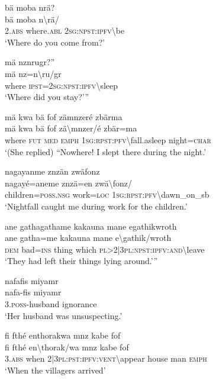 \ea\label{ex:7:a4778}
bä moba nrä?\\
\gll bä	moba	n{\textbackslash}rä/\\
     2.\textsc{abs}	where.\textsc{abl}	2\textsc{sg}:\textsc{npst}:\textsc{ipfv}{\textbackslash}be\\
\glt `Where do you come from?'
\z

\ea\label{ex:7:a4779}
mä nznrugr?''\\
\gll mä	nz=n{\textbackslash}ru/gr\\
     where	\textsc{ipst}=2\textsc{sg}:\textsc{npst}:\textsc{ipfv}{\textbackslash}sleep\\
\glt `Where did you stay?'''
\z

\ea\label{ex:7:a4780}
mä kwa bä fof zämnzeré zbärma\\
\gll mä	kwa	bä	fof	zä{\textbackslash}mnzer/é	zbär=ma\\
     where	\textsc{fut}	\textsc{med}	\textsc{emph}	1\textsc{sg}:\textsc{rpst}:\textsc{pfv}{\textbackslash}fall.asleep	night=\textsc{char}\\
\glt `(She replied) ``Nowhere! I slept there during the night.'
\z

\ea\label{ex:7:a4782}
nagayanme znzän zwäfonz\\
\gll nagayé=aneme	znzä=en	zwä{\textbackslash}fonz/\\
     children=\textsc{poss}.\textsc{nsg}	work=\textsc{loc}	1\textsc{sg}:\textsc{rpst}:\textsc{pfv}{\textbackslash}dawn\_on\_sb\\
\glt `Nightfall caught me during work for the children.'
\z

\ea\label{ex:7:a4783}
ane gathagathame kakauna mane egathikwroth\\
\gll ane	gatha=me	kakauna	mane	e{\textbackslash}gathik/wroth\\
     \textsc{dem}	bad=\textsc{ins}	thing	which	\textsc{pl}>2|3\textsc{pl}:\textsc{npst}:\textsc{ipfv}:\textsc{and}{\textbackslash}leave\\
\glt `They had left their things lying around.'''
\z

\ea\label{ex:7:a4784}
nafafis miyamr\\
\gll nafa-fis	miyamr\\
     3.\textsc{poss}-husband	ignorance\\
\glt `Her husband was unsuspecting.'
\z

\ea\label{ex:7:a4785}
fi fthé enthorakwa mnz kabe fof\\
\gll fi	fthé	en{\textbackslash}thorak/wa	mnz	kabe	fof\\
     3.\textsc{abs}	when	2|3\textsc{pl}:\textsc{pst}:\textsc{ipfv}:\textsc{vent}{\textbackslash}appear	house	man	\textsc{emph}\\
\glt `When the villagers arrived'
\z

